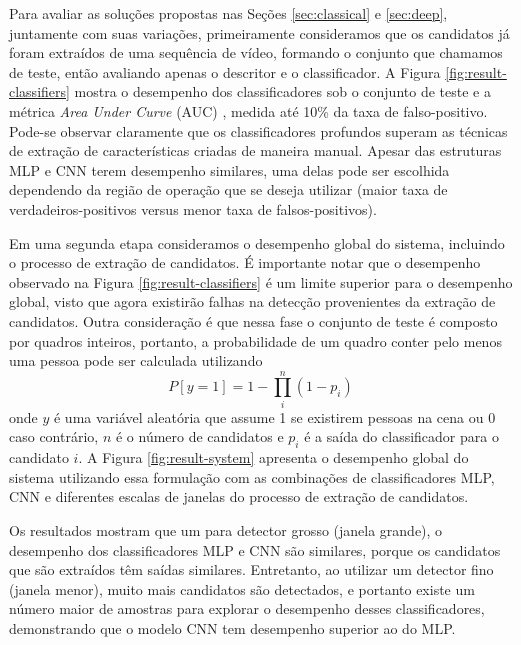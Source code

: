     Para avaliar as soluções propostas nas Seções \ref{sec:classical} e \ref{sec:deep}, juntamente com suas variações, primeiramente consideramos que os candidatos já foram extraídos de uma sequência de vídeo, formando o conjunto que chamamos de teste, então avaliando apenas o descritor e o classificador. A Figura \ref{fig:result-classifiers} mostra o desempenho dos classificadores sob o conjunto de teste e a métrica \textit{Area Under Curve} (AUC) \cite{evaluationMetrics}, medida até 10\% da taxa de falso-positivo. Pode-se observar claramente que os classificadores profundos superam as técnicas de extração de características criadas de maneira manual. Apesar das estruturas MLP e CNN terem desempenho similares, uma delas pode ser escolhida dependendo da região de operação que se deseja utilizar (maior taxa de verdadeiros-positivos versus menor taxa de falsos-positivos).

    \begin{figure*}[!t]
    \centering
    \label{fig:result-classifiers-all}
    \hfil
    \label{fig:result-classifiers-all-zoom}
    \caption{Desempenho dos classificadores.}
    \label{fig:result-classifiers}
    \end{figure*}

    Em uma segunda etapa consideramos o desempenho global do sistema, incluindo o processo de extração de candidatos. É importante notar que o desempenho observado na Figura \ref{fig:result-classifiers} é um limite superior para o desempenho global, visto que agora existirão falhas na detecção provenientes da extração de candidatos. Outra consideração é que nessa fase o conjunto de teste é composto por quadros inteiros, portanto, a probabilidade de um quadro conter pelo menos uma pessoa pode ser calculada utilizando
    \begin{equation}
    P[y=1] = 1 - \prod_i^n (1-p_i)
    \end{equation}
    onde $y$ é uma variável aleatória que assume 1 se existirem pessoas na cena ou 0 caso contrário, $n$ é o número de candidatos e $p_i$ é a saída do classificador para o candidato $i$. A Figura \ref{fig:result-system} apresenta o desempenho global do sistema utilizando essa formulação com as combinações de classificadores MLP, CNN e diferentes escalas de janelas do processo de extração de candidatos.

    Os resultados mostram que um para detector grosso (janela grande), o desempenho dos classificadores MLP e CNN são similares, porque os candidatos que são extraídos têm saídas similares. Entretanto, ao utilizar um detector fino (janela menor), muito mais candidatos são detectados, e portanto existe um número maior de amostras para explorar o desempenho desses classificadores, demonstrando que o modelo CNN tem desempenho superior ao do MLP.

